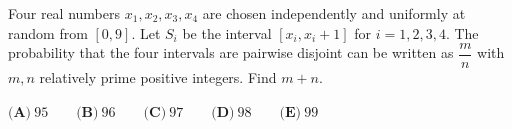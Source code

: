 Four real numbers $x_1,x_2,x_3,x_4$ are chosen independently and uniformly at random from $[0,9]$. Let $S_i$ be the interval $[x_i,x_i+1]$ for $i=1,2,3,4$. The probability that the four intervals are pairwise disjoint can be written as $\dfrac {m}{n}$ with $m,n$ relatively prime positive integers. Find $m+n$.

$\textbf{(A)}\ 95\qquad\textbf{(B)}\ 96\qquad\textbf{(C)}\ 97\qquad\textbf{(D)}\ 98\qquad\textbf{(E)}\ 99$
